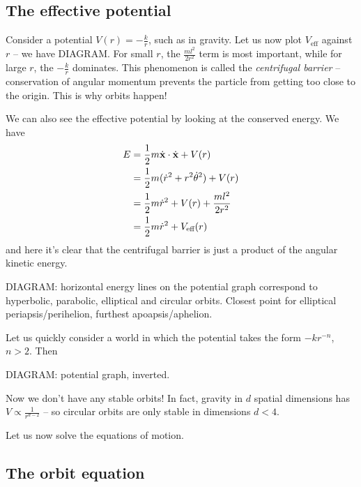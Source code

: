 \documentclass{../../template/note}
\begin{document}
    \subsection{The effective potential}

    Consider a potential \(V(r) = -\frac k r\), such as in gravity. Let us now plot \(V_\text{eff}\) against \(r\) -- we have DIAGRAM. For small \(r\), the \(\frac{ml^2}{2r^2}\) term is most important, while for large \(r\), the \(-\frac k r\) dominates. This phenomenon is called the \emph{centrifugal barrier} -- conservation of angular momentum prevents the particle from getting too close to the origin. This is why orbits happen!

    We can also see the effective potential by looking at the conserved energy. We have
    \begin{align*}
        E &= \frac 1 2 m \dot{\V x} \cdot \dot{\V x} + V(r) \\
        &= \frac 1 2 m(\dot{r}^2 + r^2 \dot{\theta}^2) + V(r) \\
        &= \frac 1 2 m\dot{r}^2 + V(r) + \frac{ml^2}{2r^2} \\
        &= \frac 1 2 m\dot{r}^2 + V_\text{eff}(r)
    \end{align*}
    and here it's clear that the centrifugal barrier is just a product of the angular kinetic energy.

    DIAGRAM: horizontal energy lines on the potential graph correspond to hyperbolic, parabolic, elliptical and circular orbits. Closest point for elliptical periapsis/perihelion, furthest apoapsis/aphelion.

    Let us quickly consider a world in which the potential takes the form \(-kr^{-n}\), \(n > 2\). Then

    DIAGRAM: potential graph, inverted.

    Now we don't have any stable orbits! In fact, gravity in \(d\) spatial dimensions has \(V \propto \frac 1 {r^{d-2}}\) -- so circular orbits are only stable in dimensions \(d < 4\).

    Let us now solve the equations of motion.

    \subsection{The orbit equation}
\end{document}
